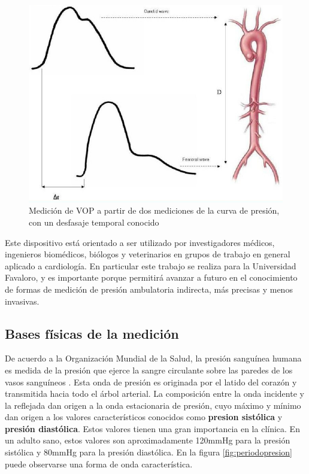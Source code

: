 \begin{figure}[!htbp]
	\centering
	\includegraphics[width=\textwidth]{./Figures/VOP.jpg}
	\caption{Medición de VOP a partir de dos mediciones de la curva de presión, con un desfasaje temporal conocido}
	\label{fig:vop}
\end{figure}

Este dispositivo está orientado a ser utilizado por investigadores médicos, ingenieros biomédicos, biólogos y veterinarios en grupos de trabajo en general aplicado a cardiología. En particular este trabajo se realiza para la Universidad Favaloro, y es importante porque permitirá avanzar a futuro en el conocimiento de formas de medición de presión ambulatoria indirecta, más precisas y menos invasivas.

\subsection{Bases físicas de la medición}

De acuerdo a la Organización Mundial de la Salud, la presión sanguínea humana es medida de la presión que ejerce la sangre circulante sobre las paredes de los vasos sanguíneos \cite{who2015}. Esta onda de presión es originada por el latido del corazón y transmitida hacia todo el árbol arterial. La composición entre la onda incidente y la reflejada dan origen a la onda estacionaria de presión, cuyo máximo y mínimo dan origen a los valores característicos conocidos como \textbf{presion sistólica} y \textbf{presión diastólica}. Estos valores tienen una gran importancia en la clínica. En un adulto sano, estos valores son aproximadamente 120mmHg para la presión sistólica y 80mmHg para la presión diastólica. En la figura \ref{fig:periodopresion} puede observarse una forma de onda característica.

